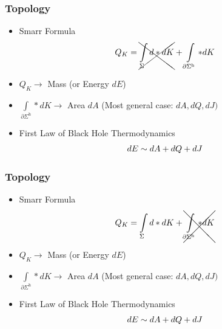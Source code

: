 \documentclass[t]{beamer}
\begin{document}

\begin{frame}
\frametitle{Topology}

\begin{itemize}
\setlength{\parskip}{10pt}
\item<1-> Smarr Formula
\begin{align}
Q_{K} = \xcancel{\int\limits_{\Sigma} d *dK} + \int\limits_{\partial \Sigma^{\text{h}}} *dK \notag
\end{align}

\item<2-> $Q_K \rightarrow$ Mass (or Energy $dE$)

\item<3-> $\int\limits_{\partial \Sigma^{\text{h}}} *dK  \rightarrow$ Area $dA$ \:\:\:\:\: (Most general case: $dA, dQ, dJ)$

\item<4-> First Law of Black Hole Thermodynamics
\vspace{0.5em}
\begin{align}
dE \sim dA + dQ + dJ \notag
\end{align}
\end{itemize}

\end{frame}

\begin{frame}
\frametitle{Topology}

\begin{itemize}
\setlength{\parskip}{10pt}
\item Smarr Formula
\begin{align}
Q_{K} =\int\limits_{\Sigma} d *dK +  \xcancel{\int\limits_{\partial \Sigma^{\text{h}}} *dK} \notag
\end{align}

\item $Q_K \rightarrow$ Mass (or Energy $dE$)

\item $\int\limits_{\partial \Sigma^{\text{h}}} *dK  \rightarrow$ Area $dA$ \:\:\:\:\: (Most general case: $dA, dQ, dJ)$

\item First Law of Black Hole Thermodynamics
\vspace{0.5em}
\begin{align}
dE \sim dA + dQ + dJ \notag
\end{align}
\end{itemize}

\end{frame}
\end{document}

